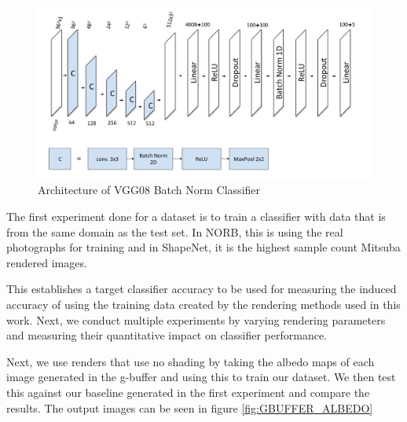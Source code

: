 \documentclass[10pt,twocolumn,letterpaper]{article}
\begin{document}
\begin{figure}[h!]
\centering
\includegraphics[width=1.0\columnwidth]{./assets/vgg08_diagram.pdf}
\caption{Architecture of VGG08 Batch Norm Classifier}
\label{fig:VGG_DAIGRAM}
\end{figure}

The first experiment done for a dataset is to train a classifier with data that is from the same domain as the test set.  In NORB, this is using the real photographs for training and in ShapeNet, it is the highest sample count Mitsuba rendered images. %

This establishes a target classifier accuracy to be used for measuring the induced accuracy of using the training data created by the rendering methods used in this work. Next, we conduct multiple experiments by varying rendering parameters and measuring their quantitative impact on classifier performance.

Next, we use renders that use no shading by taking the albedo maps of each image generated in the g-buffer and using this to train our dataset. We then test this against our baseline generated in the first experiment and compare the results. The output images can be seen in figure \ref{fig:GBUFFER_ALBEDO}
\end{document}
